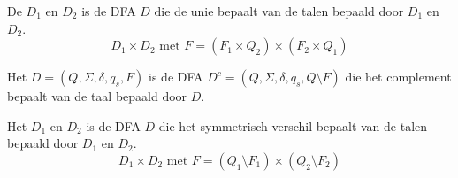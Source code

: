 \documentclass[main.tex]{subfiles}
\begin{document}

\begin{de}
  De  $D_{1}$ en $D_{2}$ is de DFA $D$ die de unie bepaalt van de talen bepaald door $D_{1}$ en $D_{2}$.
  \[ D_{1} \times D_{2} \text{ met } F = (F_{1}\times Q_{2}) \times (F_{2} \times Q_{1}) \]
\end{de}


\begin{de}
  Het  $D = (Q,\Sigma, \delta, q_{s},F)$ is de DFA $D^{c} = (Q,\Sigma, \delta, q_{s},Q\setminus F)$ die het complement bepaalt van de taal bepaald door $D$.
\end{de}


\begin{de}
  \label{de:symmetrisch-verschil-dfas}
  Het  $D_{1}$ en $D_{2}$ is de DFA $D$ die het symmetrisch verschil bepaalt van de talen bepaald door $D_{1}$ en $D_{2}$.
  \[ D_{1} \times D_{2} \text{ met } F = (Q_{1}\setminus F_{1}) \times (Q_{2}\setminus F_{2}) \]
\end{de}

\end{document}
